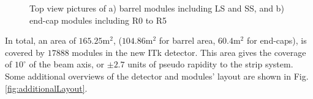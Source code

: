 \begin{figure}[h]
\begin{subfigure}[b]{0.45\textwidth}
        \caption{}\label{fig:endcap}
    \end{subfigure}
        \caption{Top view pictures of a) barrel modules including LS and SS, and b) end-cap modules including R0 to R5\cite{tishelman2024quality} }
        \label{fig:picModules}
\end{figure}

In total, an area of $165.25 \si{\meter\squared}$, ($104.86 \si{\meter\squared}$ for barrel area, $60.4 \si{\meter\squared}$ for end-caps), is covered by $17888$ modules in the new ITk detector. This area gives the coverage of $10^{\circ}$ of the beam axis, or $\pm 2.7$ units of pseudo rapidity to the strip system. Some additional overviews of the detector and modules' layout are shown in Fig.\ref{fig:additionalLayout}\cite{Collaboration:390920}. 


